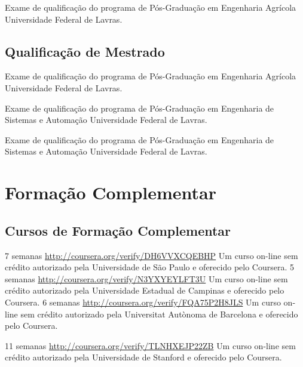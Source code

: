 \documentclass[11pt,a4paper,sans]{moderncv} %
\begin{document}
			{}
			{Exame de qualificação do programa de Pós-Graduação em Engenharia Agrícola}{}
			{Universidade Federal de Lavras.}
			
\subsection{Qualificação de Mestrado}
			{}
			{Exame de qualificação do programa de Pós-Graduação em Engenharia Agrícola}{}
			{Universidade Federal de Lavras.}

			{}
			{Exame de qualificação do programa de Pós-Graduação em Engenharia de Sistemas e Automação}{}
			{Universidade Federal de Lavras.}

			{}
			{Exame de qualificação do programa de Pós-Graduação em Engenharia de Sistemas e Automação}{}
			{Universidade Federal de Lavras.}
\section{Formação Complementar}

\subsection{ Cursos de Formação Complementar }
	      {7 semanas}
	      {\url{http://coursera.org/verify/DH6VVXCQEBHP}}{}
	      {Um curso on-line sem crédito autorizado pela Universidade de São Paulo e oferecido pelo Coursera.}
	      {5 semanas}
	      {\url{http://coursera.org/verify/N3YXYEYLFT3U}}{}
	      {Um curso on-line sem crédito autorizado pela Universidade Estadual de Campinas e oferecido pelo Coursera.}
	      {6 semanas}
	      {\url{http://coursera.org/verify/FQA75P2H8JLS}}{}
	      {Um curso on-line sem crédito autorizado pela Universitat Autònoma de Barcelona e oferecido pelo Coursera.}

	      {11 semanas}
	      {\url{http://coursera.org/verify/TLNHXEJP22ZB}}{}
	      {Um curso on-line sem crédito autorizado pela Universidade de Stanford e oferecido pelo Coursera.}
\end{document}
